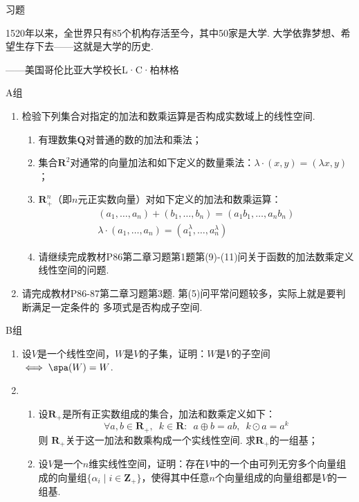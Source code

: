 \centerline{\heiti \Large 习题}
\vspace{2ex}
{\kaishu 1520年以来，全世界只有85个机构存活至今，其中50家是大学. 大学依靠梦想、希望生存下去——这就是大学的历史.}
\begin{flushright}
    \kaishu
    ——美国哥伦比亚大学校长L·C·柏林格
\end{flushright}
\centerline{\heiti A组}
\begin{enumerate}
    \item 检验下列集合对指定的加法和数乘运算是否构成实数域上的线性空间.
    \begin{enumerate}[label=(\arabic*)]
        \item 有理数集$\mathbf{Q}$对普通的数的加法和乘法；

        \item 集合$\mathbf{R}^2$对通常的向量加法和如下定义的数量乘法：$\lambda\cdot(x,y)=(\lambda x,y)$；

        \item $\mathbf{R}_+^n$（即$n$元正实数向量）对如下定义的加法和数乘运算：
        \begin{gather*}
            (a_1,\ldots,a_n)+(b_1,\ldots,b_n)=(a_1b_1,\ldots,a_nb_n) \\
            \lambda\cdot(a_1,\ldots,a_n)=(a_1^\lambda,\ldots,a_n^\lambda)
        \end{gather*}

        \item 请继续完成教材P86第二章习题第1题第(9)-(11)问关于函数的加法数乘定义线性空间的问题.
    \end{enumerate}
    \item 请完成教材P86-87第二章习题第3题. 第(5)问平常问题较多，实际上就是要判断满足一定条件的
          多项式是否构成子空间.
\end{enumerate}
\centerline{\heiti B组}
\begin{enumerate}
    \item 设$V$是一个线性空间，$W$是$V$的子集，证明：$W$是$V$的子空间$\iff \spa(W)=W$.
    \item \begin{enumerate}[label=(\arabic*)]
        \item 设$\mathbf{R}_+$是所有正实数组成的集合，加法和数乘定义如下：\[ \forall a,b \in \mathbf{R}_+,\enspace k\in \mathbf{R}\colon\enspace a\oplus b = ab,\enspace k\odot a = a^k \] 则 $\mathbf{R}_+$关于这一加法和数乘构成一个实线性空间. 求$\mathbf{R}_+$的一组基；

        \item 设$V$是一个$n$维实线性空间，证明：存在$V$中的一个由可列无穷多个向量组成的向量组$\{\alpha_i \mid i\in\mathbf{Z}_+\}$，使得其中任意$n$个向量组成的向量组都是$V$的一组基.
    \end{enumerate}
\end{enumerate}
